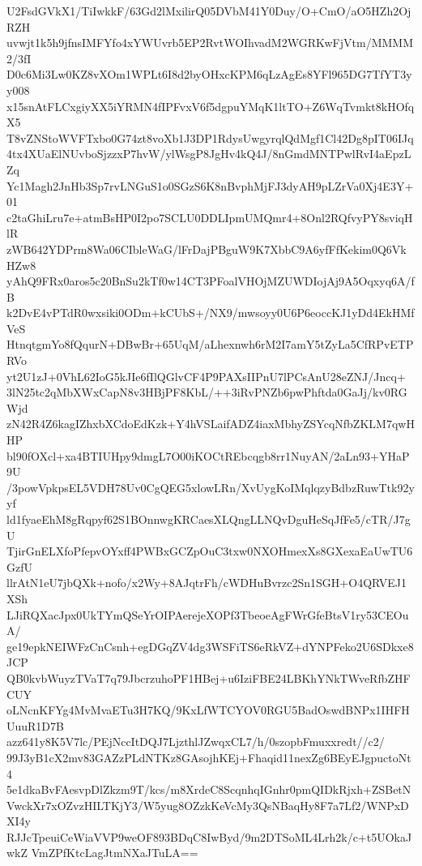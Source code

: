 U2FsdGVkX1/TiIwkkF/63Gd2lMxilirQ05DVbM41Y0Duy/O+CmO/aO5HZh2OjRZH
uvwjt1k5h9jfnsIMFYfo4xYWUvrb5EP2RvtWOIhvadM2WGRKwFjVtm/MMMM2/3fI
D0c6Mi3Lw0KZ8vXOm1WPLt6I8d2byOHxcKPM6qLzAgEs8YFl965DG7TfYT3yy008
x15snAtFLCxgiyXX5iYRMN4fIPFvxV6f5dgpuYMqK1ltTO+Z6WqTvmkt8kHOfqX5
T8vZNStoWVFTxbo0G74zt8voXb1J3DP1RdysUwgyrqlQdMgf1Cl42Dg8pIT06IJq
4tx4XUaElNUvboSjzzxP7hvW/ylWsgP8JgHv4kQ4J/8nGmdMNTPwlRvI4aEpzLZq
Yc1Magh2JnHb3Sp7rvLNGuS1o0SGzS6K8nBvphMjFJ3dyAH9pLZrVa0Xj4E3Y+01
c2taGhiLru7e+atmBsHP0I2po7SCLU0DDLIpmUMQmr4+8Onl2RQfvyPY8sviqHlR
zWB642YDPrm8Wa06CIbleWaG/lFrDajPBguW9K7XbbC9A6yfFfKekim0Q6VkHZw8
yAhQ9FRx0aros5c20BnSu2kTf0w14CT3PFoalVHOjMZUWDIojAj9A5Oqxyq6A/fB
k2DvE4vPTdR0wxsiki0ODm+kCUbS+/NX9/mwsoyy0U6P6eoccKJ1yDd4EkHMfVeS
HtnqtgmYo8fQqurN+DBwBr+65UqM/aLhexnwh6rM2I7amY5tZyLa5CfRPvETPRVo
yt2U1zJ+0VhL62IoG5kJIe6fIlQGlvCF4P9PAXsIIPnU7lPCsAnU28eZNJ/Jncq+
3lN25tc2qMbXWxCapN8v3HBjPF8KbL/++3iRvPNZb6pwPhftda0GaJj/kv0RGWjd
zN42R4Z6kagIZhxbXCdoEdKzk+Y4hVSLaifADZ4iaxMbhyZSYcqNfbZKLM7qwHHP
bl90fOXcl+xa4BTIUHpy9dmgL7O00iKOCtREbcqgb8rr1NuyAN/2aLn93+YHaP9U
/3powVpkpsEL5VDH78Uv0CgQEG5xlowLRn/XvUygKoIMqlqzyBdbzRuwTtk92yyf
ld1fyaeEhM8gRqpyf62S1BOnnwgKRCaesXLQngLLNQvDguHeSqJfFe5/cTR/J7gU
TjirGnELXfoPfepvOYxff4PWBxGCZpOuC3txw0NXOHmexXs8GXexaEaUwTU6GzfU
llrAtN1eU7jbQXk+nofo/x2Wy+8AJqtrFh/cWDHuBvrzc2Sn1SGH+O4QRVEJ1XSh
LJiRQXacJpx0UkTYmQSeYrOIPAerejeXOPf3TbeoeAgFWrGfeBtsV1ry53CEOuA/
ge19epkNEIWFzCnCsnh+egDGqZV4dg3WSFiTS6eRkVZ+dYNPFeko2U6SDkxe8JCP
QB0kvbWuyzTVaT7q79JbcrzuhoPF1HBej+u6IziFBE24LBKhYNkTWveRfbZHFCUY
oLNcnKFYg4MvMvaETu3H7KQ/9KxLfWTCYOV0RGU5BadOswdBNPx1IHFHUuuR1D7B
azz641y8K5V7lc/PEjNccItDQJ7LjzthlJZwqxCL7/h/0szopbFmuxxredt//c2/
99J3yB1cX2mv83GAZzPLdNTKz8GAsojhKEj+Fhaqid11nexZg6BEyEJgpuctoNt4
5e1dkaBvFAesvpDlZkzm9T/kcs/m8XrdeC8ScqnhqIGnhr0pmQIDkRjxh+ZSBetN
VwckXr7xOZvzHILTKjY3/W5yug8OZzkKeVcMy3QsNBaqHy8F7a7Lf2/WNPxDXI4y
RJJcTpeuiCeWiaVVP9weOF893BDqC8IwByd/9m2DTSoML4Lrh2k/c+t5UOkaJwkZ
VmZPfKtcLagJtmNXaJTuLA==
